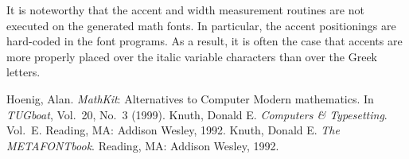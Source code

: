 \documentclass[twocolumn]{article}
\begin{document}
It is noteworthy that the accent and width measurement routines are not executed
on the generated math fonts. In particular, the accent positionings are
hard-coded in the font programs. As a result, it is often the case that accents
are more properly placed over the italic variable characters than over the Greek
letters.

\begin{thebibliography}{9}
 Hoenig, Alan. \emph{MathKit}: Alternatives to Computer Modern
mathematics. In \emph{TUGboat}, Vol.\ 20, No.\ 3 (1999).
 Knuth, Donald E\@. \emph{Computers \& Typesetting}. Vol.\ E.
Reading, MA: Addison Wesley, 1992.
 Knuth, Donald E\@. \emph{The METAFONTbook}. Reading, MA:
Addison Wesley, 1992.
\end{thebibliography}

\iffalse
\onecolumn

\def\fontname#1{\newpage\noindent\centerline{\Large\bfseries#1}\par\vskip\baselineskip}

\end{document}
